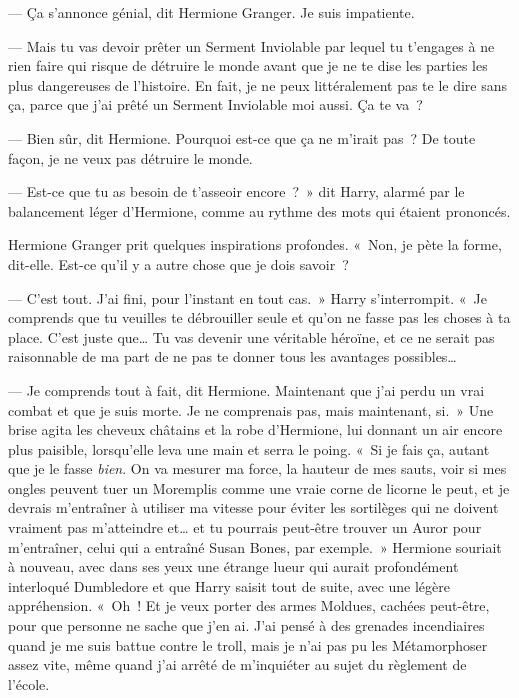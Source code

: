 --- Ça s'annonce génial, dit Hermione Granger. Je suis impatiente.

--- Mais tu vas devoir prêter un Serment Inviolable par lequel tu t'engages à ne rien faire qui risque de détruire le monde avant que je ne te dise les parties les plus dangereuses de l'histoire. En fait, je ne peux littéralement pas te le dire sans ça, parce que j'ai prêté un Serment Inviolable moi aussi. Ça te va~?

--- Bien sûr, dit Hermione. Pourquoi est-ce que ça ne m'irait pas~? De toute façon, je ne veux pas détruire le monde.

--- Est-ce que tu as besoin de t'asseoir encore~?~» dit Harry, alarmé par le balancement léger d'Hermione, comme au rythme des mots qui étaient prononcés.

Hermione Granger prit quelques inspirations profondes. «~Non, je pète la forme, dit-elle. Est-ce qu'il y a autre chose que je dois savoir~?

--- C'est tout. J'ai fini, pour l'instant en tout cas.~» Harry s'interrompit. «~Je comprends que tu veuilles te débrouiller seule et qu'on ne fasse pas les choses à ta place. C'est juste que… Tu vas devenir une véritable héroïne, et ce ne serait pas raisonnable de ma part de ne pas te donner tous les avantages possibles…

--- Je comprends tout à fait, dit Hermione. Maintenant que j'ai perdu un vrai combat et que je suis morte. Je ne comprenais pas, mais maintenant, si.~» Une brise agita les cheveux châtains et la robe d'Hermione, lui donnant un air encore plus paisible, lorsqu'elle leva une main et serra le poing. «~Si je fais ça, autant que je le fasse \emph{bien}. On va mesurer ma force, la hauteur de mes sauts, voir si mes ongles peuvent tuer un Moremplis comme une vraie corne de licorne le peut, et je devrais m'entraîner à utiliser ma vitesse pour éviter les sortilèges qui ne doivent vraiment pas m'atteindre et… et tu pourrais peut-être trouver un Auror pour m'entraîner, celui qui a entraîné Susan Bones, par exemple.~» Hermione souriait à nouveau, avec dans ses yeux une étrange lueur qui aurait profondément interloqué Dumbledore et que Harry saisit tout de suite, avec une légère appréhension. «~Oh~! Et je veux porter des armes Moldues, cachées peut-être, pour que personne ne sache que j'en ai. J'ai pensé à des grenades incendiaires quand je me suis battue contre le troll, mais je n'ai pas pu les Métamorphoser assez vite, même quand j'ai arrêté de m'inquiéter au sujet du règlement de l'école.

